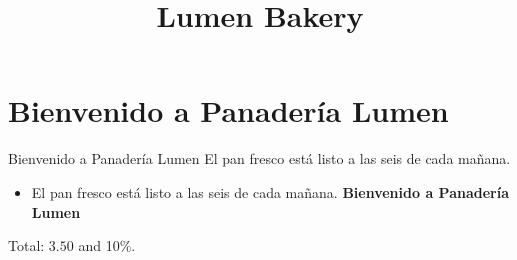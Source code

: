 \documentclass{article}
\title{Lumen Bakery}
\begin{document}
\maketitle
\section{Bienvenido a Panadería Lumen}
Bienvenido a Panadería Lumen
El pan fresco está listo a las seis de cada mañana.

\begin{itemize}
\item El pan fresco está listo a las seis de cada mañana. \textbf{Bienvenido a Panadería Lumen}
\end{itemize}
Total: $3.50$ and 10\%.
\end{document}
